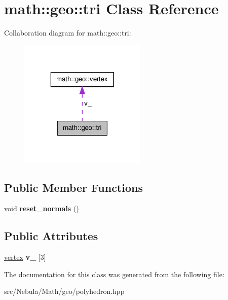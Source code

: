 \hypertarget{classmath_1_1geo_1_1tri}{\section{math\-:\-:geo\-:\-:tri \-Class \-Reference}
\label{classmath_1_1geo_1_1tri}
}


\-Collaboration diagram for math\-:\-:geo\-:\-:tri\-:\nopagebreak
\begin{figure}[H]
\begin{center}
\leavevmode
\includegraphics[width=172pt]{classmath_1_1geo_1_1tri__coll__graph}
\end{center}
\end{figure}
\subsection*{\-Public \-Member \-Functions}
\begin{DoxyCompactItemize}
\item 
\hypertarget{classmath_1_1geo_1_1tri_a9781ddeac1d6e0795ede6818f1ca52b8}{void {\bfseries reset\-\_\-normals} ()}\label{classmath_1_1geo_1_1tri_a9781ddeac1d6e0795ede6818f1ca52b8}

\end{DoxyCompactItemize}
\subsection*{\-Public \-Attributes}
\begin{DoxyCompactItemize}
\item 
\hypertarget{classmath_1_1geo_1_1tri_a1578bb4ca85d7adabc44b48e1fbbbe29}{\hyperlink{classmath_1_1geo_1_1vertex}{vertex} {\bfseries v\-\_\-} \mbox{[}3\mbox{]}}\label{classmath_1_1geo_1_1tri_a1578bb4ca85d7adabc44b48e1fbbbe29}

\end{DoxyCompactItemize}


\-The documentation for this class was generated from the following file\-:\begin{DoxyCompactItemize}
\item 
src/\-Nebula/\-Math/geo/polyhedron.\-hpp\end{DoxyCompactItemize}
